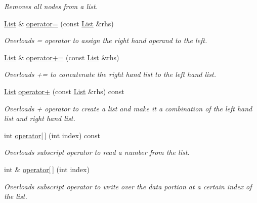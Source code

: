 \begin{DoxyCompactItemize}
\begin{DoxyCompactList}\small\item\em Removes all nodes from a list. \end{DoxyCompactList}\item 
\hyperlink{class_c_s170_1_1_list}{List} \& \hyperlink{class_c_s170_1_1_list_ab98cfaebce3d7b36575c8fe2154a46f6}{operator=} (const \hyperlink{class_c_s170_1_1_list}{List} \&rhs)
\begin{DoxyCompactList}\small\item\em Overloads = operator to assign the right hand operand to the left. \end{DoxyCompactList}\item 
\hyperlink{class_c_s170_1_1_list}{List} \& \hyperlink{class_c_s170_1_1_list_ab12061a5dc8b1ffceb6320c1a3c32b1a}{operator+=} (const \hyperlink{class_c_s170_1_1_list}{List} \&rhs)
\begin{DoxyCompactList}\small\item\em Overloads += to concatenate the right hand list to the left hand list. \end{DoxyCompactList}\item 
\hyperlink{class_c_s170_1_1_list}{List} \hyperlink{class_c_s170_1_1_list_a39e4fe39225c678bb53a73b374b08f1c}{operator+} (const \hyperlink{class_c_s170_1_1_list}{List} \&rhs) const 
\begin{DoxyCompactList}\small\item\em Overloads + operator to create a list and make it a combination of the left hand list and right hand list. \end{DoxyCompactList}\item 
int \hyperlink{class_c_s170_1_1_list_a308ed69a3c37f10c057196426e810f68}{operator\mbox{[}$\,$\mbox{]}} (int index) const 
\begin{DoxyCompactList}\small\item\em Overloads subscript operator to read a number from the list. \end{DoxyCompactList}\item 
int \& \hyperlink{class_c_s170_1_1_list_ac400d5a9390e48d65e346656699f036a}{operator\mbox{[}$\,$\mbox{]}} (int index)
\begin{DoxyCompactList}\small\item\em Overloads subscript operator to write over the data portion at a certain index of the list. \end{DoxyCompactList}\end{DoxyCompactItemize}
